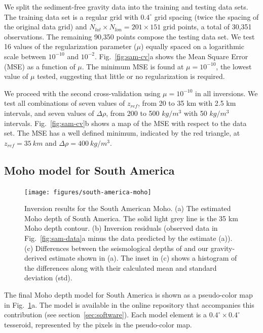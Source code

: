 \documentclass[extra,mreferee]{gji}
\begin{document}
We split the sediment-free gravity data into the training and testing data
sets.
The training data set is a regular grid with $0.4^\circ$ grid spacing
(twice the spacing of the original data grid)
and $N_{lat} \times N_{lon} = 201 \times 151$ grid points,
a total of 30,351 observations.
The remaining 90,350 points compose the testing data set.
We test 16 values of the regularization parameter ($\mu$)
equally spaced on a logarithmic scale between $10^{-10}$ and $10^{-2}$.
Fig.~\ref{fig:sam-cv}a shows the Mean Square Error (MSE)
as a function of $\mu$.
The minimum MSE is found at $\mu = 10^{-10}$, the lowest value of $\mu$ tested,
suggesting that little or no regularization is required.

We proceed with the second cross-validation using $\mu = 10^{-10}$ in all
inversions.
We test all combinations of
seven values of $z_{ref}$, from 20 to 35 km with 2.5 km intervals,
and seven values of $\Delta\rho$, from 200 to 500 $kg/m^3$
with 50 $kg/m^3$ intervals.
Fig.~\ref{fig:sam-cv}b shows a map of the MSE
with respect to the \citet{assumpcao2013a} data set.
The MSE has a well defined minimum, indicated by the red triangle,
at $z_{ref} = 35\ km$ and $\Delta\rho = 400\ kg/m^3$.


\subsection{Moho model for South America}

\begin{figure}
    \centering
    \texttt{[image: figures/south-america-moho]}
    \caption{
        Inversion results for the South American Moho.
        (a) The estimated Moho depth of South America.
        The solid light grey line is the 35 km Moho depth contour.
        (b) Inversion residuals (observed data in Fig.~\ref{fig:sam-data}a
        minus the data predicted by the estimate (a)).
        (c) Differences between the seismological depths of
        \citet{assumpcao2013a} and our gravity-derived estimate shown in (a).
        The inset in (c) shows a histogram of the differences along with their
        calculated mean and standard deviation (std).
    }
    \label{fig:sam-moho}
\end{figure}


The final Moho depth model for South America is shown
as a pseudo-color map in Fig.~\ref{fig:sam-moho}a.
The model is available in the online repository that accompanies
this contribution (see section~\ref{sec:software}).
Each model element is a $0.4^\circ \times 0.4^\circ$ tesseroid,
represented by the pixels in the pseudo-color map.
\end{document}
